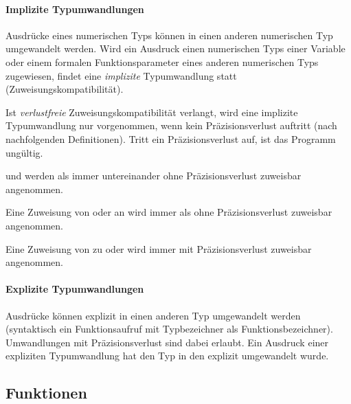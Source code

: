 \paragraph{{Implizite Typumwandlungen}}\label{__Implizite Typumwandlungen__}
Ausdrücke eines numerischen Typs können in einen anderen numerischen Typ umgewandelt werden.
Wird ein Ausdruck einen numerischen Typs einer Variable oder einem formalen Funktionsparameter
eines anderen numerischen Typs zugewiesen, findet eine \emph{implizite} Typumwandlung statt
(Zuweisungskompatibilität).

Ist \emph{verlustfreie} Zuweisungskompatibilität verlangt, wird eine implizite Typumwandlung nur
vorgenommen, wenn kein Präzisionsverlust auftritt (nach nachfolgenden Definitionen). Tritt ein
Präzisionsverlust auf, ist das Programm ungültig.

 und  werden als immer untereinander ohne Präzisionsverlust zuweisbar
angenommen.

Eine Zuweisung von  oder  an  wird immer als ohne Präzisionsverlust zuweisbar
angenommen.

Eine Zuweisung von  zu  oder  wird immer mit Präzisionsverlust zuweisbar angenommen.

\paragraph{{Explizite Typumwandlungen}}\label{__Explizite Typumwandlungen__}
Ausdrücke können explizit in einen anderen Typ umgewandelt werden (syntaktisch ein Funktionsaufruf mit
Typbezeichner als Funktionsbezeichner). Umwandlungen mit Präzisionsverlust sind dabei erlaubt.
Ein Ausdruck einer expliziten Typumwandlung hat den Typ in den explizit umgewandelt wurde.


\subsection{Funktionen}\label{Funktionen}

